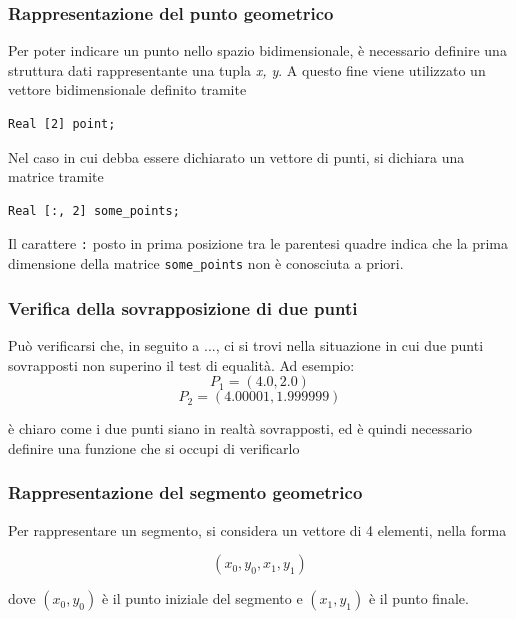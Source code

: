 \documentclass[10pt,a4paper]{article}
\newcommand{\modelicaclass}[1]{

}
\begin{document}
\subsubsection{Rappresentazione del punto geometrico}

Per poter indicare un punto nello spazio bidimensionale, è necessario definire una struttura dati rappresentante una tupla \textit{x, y}. A questo fine viene utilizzato un vettore bidimensionale definito tramite

\begin{lstlisting}[language=Modelica]
Real [2] point;
\end{lstlisting}

Nel caso in cui debba essere dichiarato un vettore di punti, si dichiara una matrice tramite

\begin{lstlisting}[language=Modelica]
Real [:, 2] some_points;
\end{lstlisting}

Il carattere \verb|:| posto in prima posizione tra le parentesi quadre indica che la prima dimensione della matrice \verb|some_points| non è conosciuta a priori.

\subsubsection{Verifica della sovrapposizione di due punti}

Può verificarsi che, in seguito a ..., ci si trovi nella situazione in cui due punti sovrapposti non superino il test di equalità. Ad esempio:
\[
P_1 = (4.0, 2.0)
\]
\[
P_2 = (4.00001, 1.999999)
\]

è chiaro come i due punti siano in realtà sovrapposti, ed è quindi necessario definire una funzione che si occupi di verificarlo


\modelicaclass{PointsAreClose.mo}

\subsubsection{Rappresentazione del segmento geometrico}

Per rappresentare un segmento, si considera un vettore di 4 elementi, nella forma

\[
(x_0, y_0, x_1, y_1)
\]

dove $(x_0, y_0)$ è il punto iniziale del segmento e $(x_1, y_1)$ è il punto finale.
\end{document}
